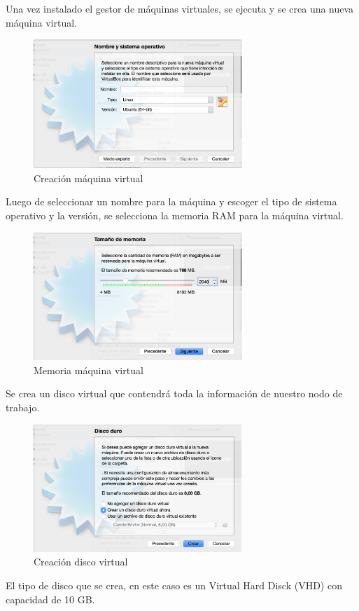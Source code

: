 Una vez instalado el gestor de máquinas virtuales, se ejecuta y se crea una nueva máquina virtual.
\begin{figure}[h]
\centering
\includegraphics[width=0.7\textwidth]{vbox/newmachine.png}
\decoRule
\caption{Creación máquina virtual}
\label{fig:Nueva máquina}
\end{figure}
\FloatBarrier
Luego de seleccionar un nombre para la máquina y escoger el tipo de sistema operativo y la versión, se selecciona la memoria RAM para la máquina virtual.
\begin{figure}[h]
\centering
\includegraphics[width=0.7\textwidth]{vbox/memory.png}
\decoRule
\caption{Memoria máquina virtual}
\label{fig:Memoria virtual}
\end{figure}
\FloatBarrier

Se crea un disco virtual que contendrá toda la información de nuestro nodo de trabajo.
\begin{figure}[h]
\centering
\includegraphics[width=0.7\textwidth]{vbox/virtualdisck.png}
\decoRule
\caption{Creación disco virtual}
\label{fig:Disco virtual}
\end{figure}
\FloatBarrier
El tipo de disco que se crea, en este caso es un Virtual Hard Disck (VHD) con capacidad de 10 GB.

